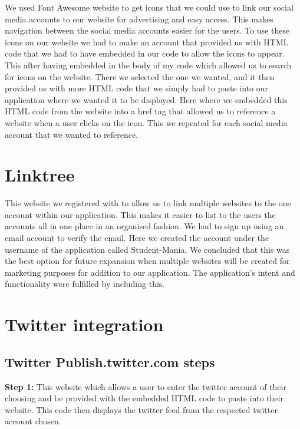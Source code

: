 We used Font Awesome\cite{ref29} website to get icons that we could use to link our social media accounts to our website for advertising and easy access. This makes navigation between the social media accounts easier for the users.
To use these icons on our website we had to make an account that provided us with HTML code that we had to have embedded in our code to allow the icons to appear.
This after having embedded in the body of my code which allowed us to search for icons on the website. There we selected the one we wanted, and it then provided us with more HTML code that we simply had to paste into our application where we wanted it to be displayed. Here where we embedded this HTML code from the website into a href tag that allowed us to reference a website when a user clicks on the icon. This we repeated for each social media account that we wanted to reference.




\section{Linktree}

This website we registered with to allow us to link multiple websites to the one account within our application. This makes it easier to list to the users the accounts all in one place in an organised fashion. We had to sign up using an email account to verify the email. Here we created the account under the username of the application called Student-Mania. We concluded that this was the best option for future expansion when multiple websites will be created for marketing purposes for addition to our application. The application's intent and functionality were fulfilled by including this.


\section{Twitter integration}

\subsection{Twitter Publish.twitter.com steps}

\textbf{Step 1:} \hfill \break
This website which allows a user to enter the twitter account of their choosing and be provided with the embedded HTML code to paste into their website. This code then displays the twitter feed from the respected twitter account chosen.\hfill \break

